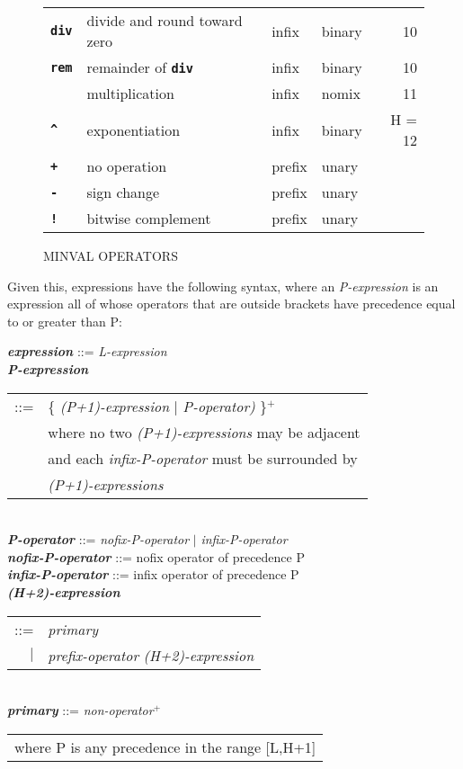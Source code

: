 \documentclass[12pt]{article}
\newcommand{\TT}[1]{{\tt \bfseries #1}}
\newcommand{\PLUS}[1][]{{$^{+#1}$}}
\newcommand{\ttkey}[1]{{\tt \bfseries #1}}
\newcommand{\emkey}[1]{{\em \bfseries #1}}
\newlength{\figurewidth}
\newenvironment{boxedfigure}[1][!btp]%
	{\begin{figure*}[#1]
	 \begin{lrbox}{\figurebox}
	 \begin{minipage}{\figurewidth}

	 \vspace*{1ex}}%
	{
	 \vspace*{1ex}

	 \end{minipage}
	 \end{lrbox}

	 \vspace*{-15ex}
	 \centering
	 \fbox{\hspace*{0.1in}\usebox{\figurebox}\hspace*{0.1in}}
	 \end{figure*}}
\newenvironment{indpar}[1][0.3in]%
	{\begin{list}{}%
		     {\setlength{\itemsep}{0in}%
		      \setlength{\topsep}{0in}%
		      \setlength{\parsep}{1ex}%
		      \setlength{\labelwidth}{#1}%
		      \setlength{\leftmargin}{#1}%
		      \addtolength{\leftmargin}{\labelsep}}%
	 \item}%
	{\end{list}}
\begin{document}
\begin{boxedfigure}[!p]
\begin{center}
\begin{tabular}{|llllr|}
\ttkey{div} & divide and round toward zero & infix & binary & 10 \\
\ttkey{rem} & remainder of \TT{div} & infix & binary & 10 \\
\hline
\ttkey{*} & multiplication & infix & nomix & 11 \\
\hline
\ttkey{\textasciicircum} & exponentiation & infix & binary & H = 12 \\
\hline
\ttkey{+} & no operation & prefix & unary & \\
\ttkey{-} & sign change & prefix & unary & \\
\ttkey{!} & bitwise complement & prefix & unary & \\
\hline

\end{tabular}
\end{center}

\caption{MINVAL OPERATORS}
\label{MINVAL-OPERATORS}
\end{boxedfigure}

Given this, expressions have the following syntax,
where an {\em P-expression}
is an expression all of whose operators that are outside brackets
have precedence equal to or greater than P:

\begin{indpar}\begin{minipage}{6in}
\emkey{expression}\label{EXPRESSION} ::= {\em L-expression}
\\[0.5ex]
\emkey{P-expression}
    \begin{tabular}[t]{@{}rl}
    ::= & \{ {\em (P+1)-expression} $|$ {\em P-operator)} \}\PLUS{} \\
        & where no two {\em (P+1)-expressions} may be adjacent \\ 
        & and each {\em infix-P-operator} must be surrounded by \\
	& {\em (P+1)-expressions} \\
    \end{tabular}
\\[0.5ex]
\emkey{P-operator} ::= {\em nofix-P-operator} $|$ {\em infix-P-operator}
\\[0.5ex]
\emkey{nofix-P-operator} ::= nofix operator of precedence P
\\[0.5ex]
\emkey{infix-P-operator} ::= infix operator of precedence P
\\[0.5ex]
\emkey{(H+2)-expression}
    \begin{tabular}[t]{@{}rl}
    ::= & {\em primary} \\
    $|$ & {\em prefix-operator} {\em (H+2)-expression} \\
    \end{tabular}
\\[0.5ex]
\emkey{primary} ::= {\em non-operator}\PLUS{}
\\[2.0ex]
\hspace*{3em}\begin{tabular}{l}
where P is any precedence in the range [L,H+1]
\end{tabular}
\end{minipage}\end{indpar}
\end{document}
